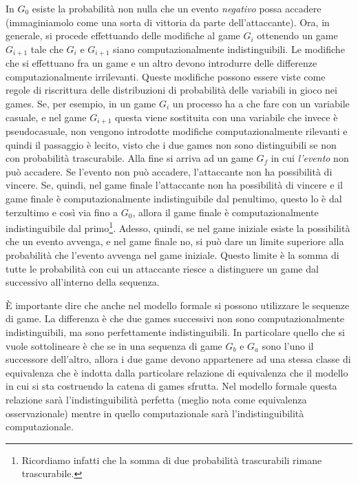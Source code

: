 \documentclass[a4paper,openright,twoside,12pt]{report}
\begin{document}
In $G_0$ esiste la probabilit\`a non nulla che un evento \emph{negativo} possa accadere (immaginiamolo come una sorta di vittoria da parte dell'attaccante).
Ora, in generale, si procede effettuando delle modifiche al game $G_i$ ottenendo un game $G_{i+1}$ 
tale che $G_i$ e $G_{i+1}$ siano computazionalmente indistinguibili. Le modifiche che si effettuano fra un game e un altro devono introdurre delle differenze computazionalmente irrilevanti.
Queste modifiche possono essere viste come regole di riscrittura delle distribuzioni di probabilit\`a delle variabili in gioco nei games.
Se, per esempio, in un game $G_i$ un processo ha a che fare con un variabile casuale, e nel game $G_{i+1}$ questa viene sostituita con una variabile che invece \`e pseudocasuale, non vengono introdotte
modifiche computazionalmente rilevanti e quindi il passaggio \`e lecito, visto che i due games non sono distinguibili se non con probabilit\`a trascurabile.
Alla fine si arriva ad un game $G_f$ in cui \emph{l'evento} non pu\`o accadere. Se l'evento non pu\`o accadere, l'attaccante non ha possibilit\`a di vincere. 
Se, quindi, nel game finale l'attaccante non ha possibilit\`a di vincere e il game finale
\`e computazionalmente indistinguibile dal penultimo, questo lo \`e dal terzultimo e cos\`i via fino a $G_0$, allora
il game finale \`e computazionalmente indistinguibile dal primo\footnote{Ricordiamo infatti che la somma di due probabilit\`a trascurabili rimane trascurabile.}. 
Adesso, quindi, se nel game iniziale esiste la possibilit\`a che un evento avvenga, e nel game finale no,
si pu\`o dare un limite superiore alla probabilit\`a che l'evento avvenga nel game iniziale. Questo limite \`e la somma di tutte le probabilit\`a con cui un attaccante riesce a distinguere un game dal successivo all'interno della sequenza.

\`E importante dire che anche nel modello formale si possono utilizzare le sequenze di game. La differenza \`e che due games successivi non sono computazionalmente indistinguibili, 
ma sono perfettamente indistinguibili. In particolare quello che si vuole sottolineare \`e che se in una sequenza di game $G_b$ e $G_a$ sono l'uno il successore dell'altro, 
allora i due game 
devono appartenere ad una stessa classe di equivalenza che \`e indotta dalla particolare relazione di equivalenza che il modello in cui si sta costruendo la catena di games sfrutta.
Nel modello formale questa relazione sar\`a l'indistinguibilit\`a perfetta (meglio nota come equivalenza osservazionale) mentre in quello computazionale sar\`a 
l'indistinguibilit\`a computazionale.
\end{document}
